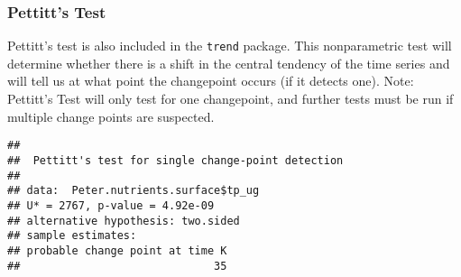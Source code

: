 \documentclass[]{article}
\newenvironment{Shaded}{\begin{snugshade}}{\end{snugshade}}
\newcommand{\KeywordTok}[1]{\textcolor[rgb]{0.13,0.29,0.53}{\textbf{#1}}}
\newcommand{\DecValTok}[1]{\textcolor[rgb]{0.00,0.00,0.81}{#1}}
\newcommand{\CommentTok}[1]{\textcolor[rgb]{0.56,0.35,0.01}{\textit{#1}}}
\newcommand{\OperatorTok}[1]{\textcolor[rgb]{0.81,0.36,0.00}{\textbf{#1}}}
\newcommand{\NormalTok}[1]{#1}
\begin{document}
\subsubsection{Pettitt's Test}\label{pettitts-test}

Pettitt's test is also included in the \texttt{trend} package. This
nonparametric test will determine whether there is a shift in the
central tendency of the time series and will tell us at what point the
changepoint occurs (if it detects one). Note: Pettitt's Test will only
test for one changepoint, and further tests must be run if multiple
change points are suspected.

\begin{Shaded}
\end{Shaded}

\begin{verbatim}
## 
##  Pettitt's test for single change-point detection
## 
## data:  Peter.nutrients.surface$tp_ug
## U* = 2767, p-value = 4.92e-09
## alternative hypothesis: two.sided
## sample estimates:
## probable change point at time K 
##                              35
\end{verbatim}

\begin{Shaded}
\end{Shaded}
\end{document}
